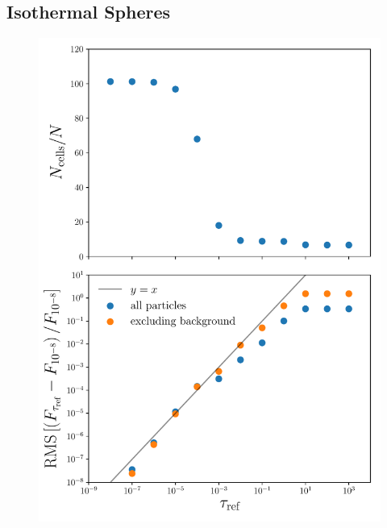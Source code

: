 \documentclass[fleq,usenatbib]{mnras}
\begin{document}
\subsection{Isothermal Spheres}
\begin{figure}
\includegraphics[width=1\linewidth]{Figures/isothermal_spheres.pdf}
\caption{}
\label{fig:isosph}
\end{figure}
\end{document}
